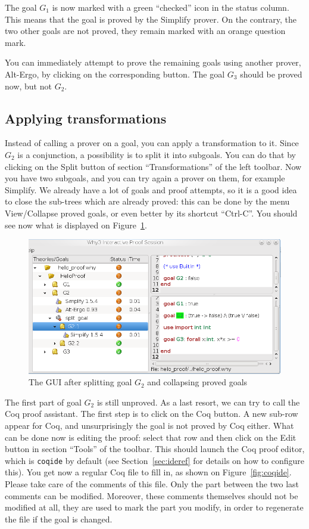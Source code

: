 The goal $G_1$ is now marked with a green ``checked'' icon in the
status column. This means that the goal is proved by the Simplify
prover. On the contrary, the two other goals are not proved, they remain
marked with an orange question mark.

You can immediately attempt to prove the remaining goals using another
prover, {\eg} Alt-Ergo, by clicking on the corresponding button. The
goal $G_3$ should be proved now, but not $G_2$.

\subsection{Applying transformations}

Instead of calling a prover on a goal, you can apply a transformation
to it.  Since $G_2$ is a conjunction, a possibility is to split it
into subgoals. You can do that by clicking on the \textsf{Split}
button of section ``Transformations'' of the left toolbar. Now you
have two subgoals, and you can try again a prover on them, for example
Simplify. We already have a lot of goals and proof attempts, so it is a good idea to close the sub-trees which are already proved: this can be done by the menu \textsf{View/Collapse proved goals}, or even better by its shortcut ``Ctrl-C''.
You should see now what is displayed on Figure~\ref{fig:gui4}.

\begin{figure}[tbp]
 \includegraphics[width=\textwidth]{gui-0-70-4.png}
  \caption{The GUI after splitting goal $G_2$ and collapsing proved goals}
  \label{fig:gui4}
\end{figure}

The first part of goal $G_2$ is still unproved. As a last resort, we
can try to call the Coq proof assistant. The first step is to click on
the \textsf{Coq} button. A new sub-row appear for Coq, and
unsurprisingly the goal is not proved by Coq either. What can be done
now is editing the proof: select that row and then click on the
\textsf{Edit} button in section ``Tools'' of the toolbar. This should
launch the Coq proof editor, which is \texttt{coqide} by default (see
Section~\ref{sec:ideref} for details on how to configure this). You get
now a regular Coq file to fill in, as shown on Figure~\ref{fig:coqide}.
Please take care of the comments of this file. Only the part between
the two last comments can be modified. Moreover, these comments
themselves should not be modified at all, they are used to mark the
part you modify, in order to regenerate the file if the goal is
changed.

